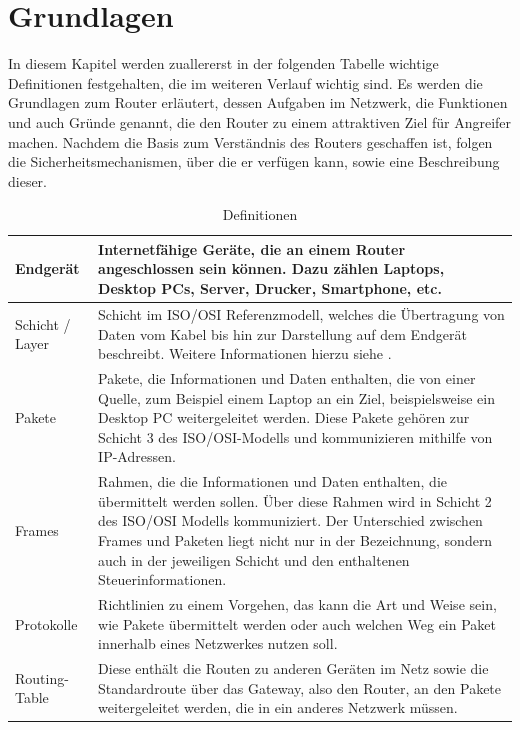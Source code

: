	\chapter{Grundlagen}
	In diesem Kapitel werden zuallererst in der folgenden Tabelle wichtige Definitionen 
	festgehalten, die im weiteren Verlauf wichtig sind. Es werden 
	die Grundlagen zum Router erläutert, dessen Aufgaben im Netzwerk, die Funktionen 
	und auch Gründe genannt, die den Router zu einem attraktiven Ziel für Angreifer machen.
	Nachdem die Basis zum Verständnis des Routers geschaffen ist, folgen die 
	Sicherheitsmechanismen, über die er verfügen kann, sowie eine Beschreibung 
	dieser.
	\begin{table}[H]
		\hypertarget{tab_definition}{}
		\begin{tabularx}{\columnwidth}{|l|X|}
			\hline
			Endgerät & Internetfähige Geräte, die an einem Router angeschlossen sein können. 
			Dazu zählen Laptops, Desktop PCs, Server, Drucker, Smartphone, etc.\\ 
			\hline
			Schicht / Layer & Schicht im ISO/OSI Referenzmodell, welches die Übertragung
			von Daten vom Kabel bis hin zur Darstellung auf dem Endgerät beschreibt. 
			Weitere Informationen hierzu siehe \cite[S.25-16]{zisler2022}.\\
			\hline
			Pakete & Pakete, die Informationen und Daten enthalten, die von einer 
			Quelle, zum Beispiel einem Laptop an ein Ziel, beispielsweise ein Desktop PC
			weitergeleitet werden. Diese Pakete gehören zur Schicht 3 des ISO/OSI-Modells
			und kommunizieren mithilfe von IP-Adressen.\\
			\hline
			Frames & Rahmen, die die Informationen und Daten enthalten, die übermittelt
			werden sollen. Über diese Rahmen wird in Schicht 2 des ISO/OSI Modells
			kommuniziert. Der Unterschied zwischen Frames und Paketen liegt nicht nur 
			in der Bezeichnung, sondern auch in der jeweiligen Schicht und den
			enthaltenen Steuerinformationen.\\
			\hline
			Protokolle & Richtlinien zu einem Vorgehen, das kann die Art und Weise sein,
			wie Pakete übermittelt werden oder auch welchen Weg ein Paket innerhalb eines
			Netzwerkes nutzen soll.\\
			\hline
			Routing-Table & Diese enthält die Routen zu anderen Geräten im Netz sowie 
			die Standardroute über das Gateway, also den Router, an den Pakete 
			weitergeleitet werden, die in ein anderes Netzwerk müssen.\\
			\hline
		\end{tabularx}
		\caption{Definitionen}
		\label{tab:definition}
	\end{table}
